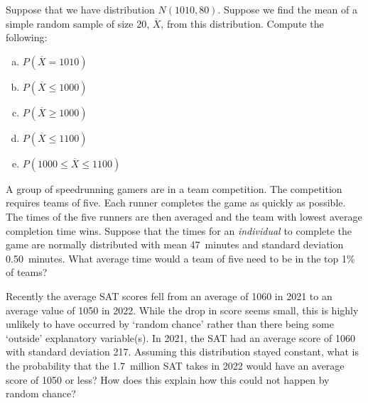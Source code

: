 \documentclass[11pt,letterpaper]{article}
\begin{document}

 Suppose that we have distribution $N(1010, 80)$. Suppose we find the mean of a simple random sample of size 20, $\overline{X}$, from this distribution. Compute the following:
	\begin{enumerate}[(a)]
	\item $P(\overline{X}= 1010)$
	\item $P(\overline{X} \leq 1000)$
	\item $P(\overline{X} \geq 1000)$
	\item $P(\overline{X} \leq 1100)$
	\item $P(1000 \leq \overline{X} \leq 1100)$
	\end{enumerate}



\newpage



 A group of speedrunning gamers are in a team competition. The competition requires teams of five. Each runner completes the game as quickly as possible. The times of the five runners are then averaged and the team with lowest average completion time wins. Suppose that the times for an \textit{individual} to complete the game are normally distributed with mean 47~minutes and standard deviation 0.50~minutes. What average time would a team of five need to be in the top 1\% of teams?



\newpage


 Recently the average SAT scores fell from an average of 1060 in 2021 to an average value of 1050 in 2022. While the drop in score seems small, this is highly unlikely to have occurred by `random chance' rather than there being some `outside' explanatory variable(s). In 2021, the SAT had an average score of 1060 with standard deviation 217. Assuming this distribution stayed constant, what is the probability that the 1.7~million SAT takes in 2022 would have an average score of 1050 or less? How does this explain how this could not happen by random chance? 
\end{document}
